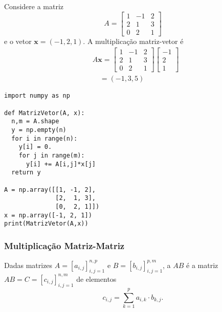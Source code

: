 \begin{ex}
  Considere a matriz
  \begin{equation}
    A =
    \begin{bmatrix}
      1 & -1 & 2\\
      2 & 1 & 3\\
      0 & 2 & 1
    \end{bmatrix}
  \end{equation}
  e o vetor $\pmb{x} = (-1, 2, 1)$. A multiplicação matriz-vetor é
  \begin{align}
    & A\pmb{x} = \begin{bmatrix}
      1 & -1 & 2\\
      2 & 1 & 3\\
      0 & 2 & 1
    \end{bmatrix}
    \begin{bmatrix}
      -1\\
      2\\
      1
    \end{bmatrix}\\
    & \text{}\quad = (-1, 3, 5)
  \end{align}

\begin{lstlisting}
import numpy as np

def MatrizVetor(A, x):
  n,m = A.shape
  y = np.empty(n)
  for i in range(n):
    y[i] = 0.
    for j in range(m):
      y[i] += A[i,j]*x[j]
  return y

A = np.array([[1, -1, 2],
              [2,  1, 3],
              [0,  2, 1]])
x = np.array([-1, 2, 1])
print(MatrizVetor(A,x))
\end{lstlisting}

\end{ex}

\subsubsection{Multiplicação Matriz-Matriz}

Dadas matrizes $A = [a_{i,j}]_{i,j=1}^{n,p}$ e $B = [b_{i,j}]_{i,j=1}^{p,m}$, a  $AB$ é a matriz $AB = C = [c_{i,j}]_{i,j=1}^{n,m}$ de elementos
\begin{equation}
  c_{i,j} = \sum_{k=1}^{p} a_{i,k}\cdot b_{k,j}.
\end{equation}

